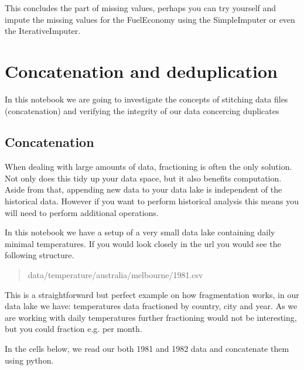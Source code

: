 \documentclass[letterpaper,10pt,english]{jupyterBook}
\begin{document}
\sphinxAtStartPar
This concludes the part of missing values, perhaps you can try yourself and impute the missing values for the FuelEconomy using the SimpleImputer or even the IterativeImputer.


\chapter{Concatenation and deduplication}
\label{\detokenize{c2_data_preparation/concatenation_deduplication:concatenation-and-deduplication}}\label{\detokenize{c2_data_preparation/concatenation_deduplication::doc}}
\sphinxAtStartPar
In this notebook we are going to investigate the concepts of stitching data files (concatenation) and verifying the integrity of our data concercing duplicates


\section{Concatenation}
\label{\detokenize{c2_data_preparation/concatenation_deduplication:concatenation}}
\sphinxAtStartPar
When dealing with large amounts of data, fractioning is often the only solution.
Not only does this tidy up your data space, but it also benefits computation.
Aside from that, appending new data to your data lake is independent of the historical data.
However if you want to perform historical analysis this means you will need to perform additional operations.

\sphinxAtStartPar
In this notebook we have a setup of a very small data lake containing daily minimal temperatures.
If you would look closely in the url you would see the following structure.
\begin{quote}

\sphinxAtStartPar
data/temperature/australia/melbourne/1981.csv
\end{quote}

\sphinxAtStartPar
This is a straight\sphinxhyphen{}forward but perfect example on how fragmentation works, in our data lake we have:
temperatures data fractioned by country, city and year. As we are working with daily temperatures further fractioning would not be interesting, but you could fraction e.g. per month.

\sphinxAtStartPar
In the cells below, we read our both 1981 and 1982 data and concatenate them using python.

\begin{sphinxVerbatim}[commandchars=\\\{\}]
   
\end{sphinxVerbatim}
\end{document}
